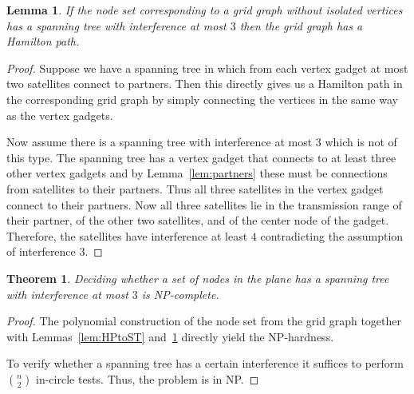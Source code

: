 \documentclass{article}
\theoremstyle{plain}
\newtheorem{thm}{Theorem}
\newtheorem{lem}{Lemma}
\theoremstyle{definition}
\theoremstyle{remark}
\begin{document}
\begin{lem}\label{lem:STtoHP}
If the node set corresponding to a grid graph without isolated vertices has
a spanning tree with interference at most $3$ then the grid graph has a
Hamilton path.
\end{lem}
\begin{proof}
Suppose we have a spanning tree in which from each vertex gadget at most two satellites
connect to partners. Then this directly gives us a Hamilton path in the corresponding
grid graph by simply connecting the vertices in the same way as the vertex gadgets.

Now assume there is a spanning tree with interference at most $3$ which is not
of this type. The spanning tree has a vertex gadget that connects to at least three
other vertex gadgets and by Lemma~\ref{lem:partners} these must be connections from
satellites to their partners. Thus all three satellites in the vertex gadget connect to their
partners. Now all three satellites lie in the transmission range of their partner, of the
other two satellites, and of the center node of the gadget. Therefore, the satellites have interference
at least $4$ contradicting the assumption of interference $3$.
\end{proof}

\begin{thm}\label{thm:nphard}
Deciding whether a set of nodes in the plane has a spanning tree with
interference at most $3$ is NP-complete.
\end{thm}
\begin{proof}
The polynomial construction of the node set from the grid graph together
with Lemmas~\ref{lem:HPtoST} and~\ref{lem:STtoHP} directly yield the NP-hardness.

To verify whether a spanning tree has a certain interference
it suffices to perform
$n \choose 2$ in-circle tests. Thus, the problem is in NP.
\end{proof}
\end{document}
